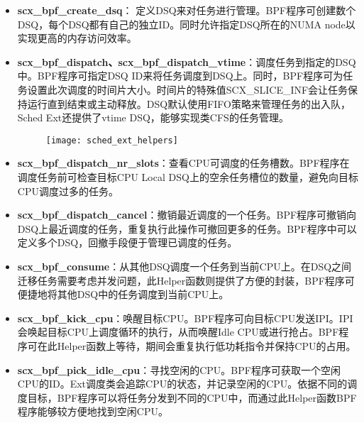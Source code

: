 \begin{itemize}

    \item \textbf{scx\_bpf\_create\_dsq}： 定义DSQ来对任务进行管理。BPF程序可创建数个DSQ，每个DSQ都有自己的独立ID。同时允许指定DSQ所在的NUMA node以实现更高的内存访问效率。

    \item \textbf{scx\_bpf\_dispatch、scx\_bpf\_dispatch\_vtime}：调度任务到指定的DSQ中。BPF程序可指定DSQ ID来将任务调度到DSQ上。同时，BPF程序可为任务设置此次调度的时间片大小。时间片的特殊值SCX\_SLICE\_INF会让任务保持运行直到结束或主动释放。DSQ默认使用FIFO策略来管理任务的出入队，Sched Ext还提供了vtime DSQ，能够实现类CFS的任务管理。

    \begin{figure}[!htbp]
        \centering
        \texttt{[image: sched\_ext\_helpers]}
        \label{fig:sched_ext_helpers}
    \end{figure}
    
    \item \textbf{scx\_bpf\_dispatch\_nr\_slots}：查看CPU可调度的任务槽数。BPF程序在调度任务前可检查目标CPU Local DSQ上的空余任务槽位的数量，避免向目标CPU调度过多的任务。

    \item \textbf{scx\_bpf\_dispatch\_cancel}：撤销最近调度的一个任务。BPF程序可撤销向DSQ上最近调度的任务，重复执行此操作可撤回更多的任务。BPF程序中可以定义多个DSQ，回撤手段便于管理已调度的任务。
    
    \item \textbf{scx\_bpf\_consume}：从其他DSQ调度一个任务到当前CPU上。在DSQ之间迁移任务需要考虑并发问题，此Helper函数则提供了方便的封装，BPF程序可便捷地将其他DSQ中的任务调度到当前CPU上。

    \item \textbf{scx\_bpf\_kick\_cpu}：唤醒目标CPU。BPF程序可向目标CPU发送IPI。IPI会唤起目标CPU上调度循环的执行，从而唤醒Idle CPU或进行抢占。BPF程序可在此Helper函数上等待，期间会重复执行低功耗指令并保持CPU的占用。

    \item \textbf{scx\_bpf\_pick\_idle\_cpu}：寻找空闲的CPU。BPF程序可获取一个空闲CPU的ID。Ext调度类会追踪CPU的状态，并记录空闲的CPU。依据不同的调度目标，BPF程序可以将任务分发到不同的CPU中，而通过此Helper函数BPF程序能够较方便地找到空闲CPU。

\end{itemize}

